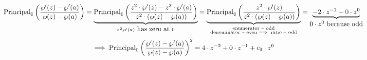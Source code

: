 \documentclass[8pt]{article} %
\renewcommand{\P}{\mbox{Principal}_0}
\begin{document}
\[{\P\mybra{\frac{{\wp}'(z)-{\wp}'(a)}{{\wp}(z)-\wp(a)}}}=
\underbrace{\P\mybra{\frac{z^2\cdot{\wp}'(z)-z^2\cdot{\wp}'(a)}{{z^2\cdot(\wp}(z)-\wp(a))}}}_
{z^2\wp'(a)\mbox{ has zero at }0}=
\underbrace{\P\mybra{\frac{z^2\cdot{\wp}'(z)}{z^2\cdot(\wp(z)-\wp(a))}}}_
{{\begin{subarray}{c}{\text{enumerator -- odd}}\\\text{denominator -- even$\implies$ ratio -- odd}\end{subarray}}}
	=\underbrace{-2\cdot z^{-1}+0\cdot z^0}_{\mbox{$0\cdot z^0$ because odd}}\]
	\[\implies \P\mybra{\frac{{\wp}'(z)-{\wp}'(a)}{{\wp}(z)-\wp(a)}}^2=4\cdot z^{-2}+0\cdot z^{-1}+c_0\cdot z^0\]
\end{document}
